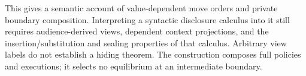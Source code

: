 This gives a semantic account of value-dependent move orders and
private boundary composition. Interpreting a syntactic disclosure
calculus into it still requires audience-derived views, dependent
context projections, and the insertion/substitution and sealing
properties of that calculus. Arbitrary view labels do not establish
a hiding theorem. The construction composes full policies and
executions; it selects no equilibrium at an intermediate boundary.
